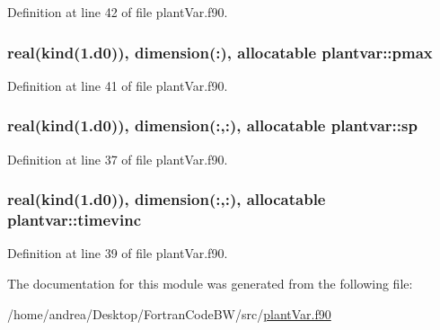 Definition at line 42 of file plant\-Var.\-f90.

\hypertarget{classplantvar_af133780045aedae72cab4d1d76ec16e5}{
\subsubsection[{pmax}]{\setlength{\rightskip}{0pt plus 5cm}real(kind(1.d0)), dimension(\-:), allocatable plantvar\-::pmax}}\label{classplantvar_af133780045aedae72cab4d1d76ec16e5}


Definition at line 41 of file plant\-Var.\-f90.

\hypertarget{classplantvar_a9ce23c96a4155736d33f064180fabeb8}{
\subsubsection[{sp}]{\setlength{\rightskip}{0pt plus 5cm}real(kind(1.d0)), dimension(\-:,\-:), allocatable plantvar\-::sp}}\label{classplantvar_a9ce23c96a4155736d33f064180fabeb8}


Definition at line 37 of file plant\-Var.\-f90.

\hypertarget{classplantvar_a6dea565d53d4827373d4f85f19b2926e}{
\subsubsection[{timevinc}]{\setlength{\rightskip}{0pt plus 5cm}real(kind(1.d0)), dimension(\-:,\-:), allocatable plantvar\-::timevinc}}\label{classplantvar_a6dea565d53d4827373d4f85f19b2926e}


Definition at line 39 of file plant\-Var.\-f90.



The documentation for this module was generated from the following file\-:\begin{DoxyCompactItemize}
\item 
/home/andrea/\-Desktop/\-Fortran\-Code\-B\-W/src/\hyperlink{plant_var_8f90}{plant\-Var.\-f90}\end{DoxyCompactItemize}
